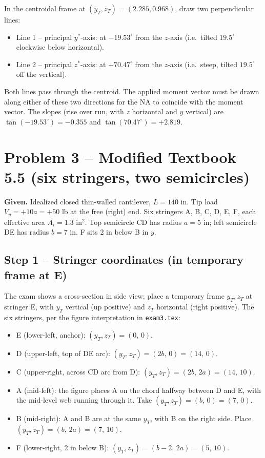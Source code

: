 \documentclass[11pt]{article}
\begin{document}
In the centroidal frame at $(\bar y_T, \bar z_T) = (2.285, 0.968)$, draw two perpendicular lines:
\begin{itemize}[leftmargin=2em, itemsep=0pt]
  \item Line 1 -- principal $y^\ast$-axis: at $-19.53^\circ$ from the $z$-axis (i.e.\ tilted $19.5^\circ$ clockwise below horizontal).
  \item Line 2 -- principal $z^\ast$-axis: at $+70.47^\circ$ from the $z$-axis (i.e.\ steep, tilted $19.5^\circ$ off the vertical).
\end{itemize}
Both lines pass through the centroid. The applied moment vector must be drawn along either of these two directions for the NA to coincide with the moment vector. The slopes (rise over run, with $z$ horizontal and $y$ vertical) are $\tan(-19.53^\circ) = -0.355$ and $\tan(70.47^\circ) = +2.819$.

\section{Problem 3 -- Modified Textbook 5.5 (six stringers, two semicircles)}

\textbf{Given.} Idealized closed thin-walled cantilever, $L = 140$ in. Tip load $V_y = +10a = +50$ lb at the free (right) end. Six stringers A, B, C, D, E, F, each effective area $A_i = 1.3$ in$^2$. Top semicircle CD has radius $a = 5$ in; left semicircle DE has radius $b = 7$ in. F sits 2 in below B in $y$.

\subsection*{Step 1 -- Stringer coordinates (in temporary frame at E)}

The exam shows a cross-section in side view; place a temporary frame $y_T, z_T$ at stringer E, with $y_T$ vertical (up positive) and $z_T$ horizontal (right positive). The six stringers, per the figure interpretation in \texttt{exam3.tex}:
\begin{itemize}[leftmargin=2em, itemsep=0pt]
  \item E (lower-left, anchor): $(y_T, z_T) = (0,\, 0)$.
  \item D (upper-left, top of DE arc): $(y_T, z_T) = (2b,\, 0) = (14,\, 0)$.
  \item C (upper-right, across CD arc from D): $(y_T, z_T) = (2b,\, 2a) = (14,\, 10)$.
  \item A (mid-left): the figure places A on the chord halfway between D and E, with the mid-level web running through it. Take $(y_T, z_T) = (b,\, 0) = (7,\, 0)$.
  \item B (mid-right): A and B are at the same $y_T$, with B on the right side. Place $(y_T, z_T) = (b,\, 2a) = (7,\, 10)$.
  \item F (lower-right, 2 in below B): $(y_T, z_T) = (b - 2,\, 2a) = (5,\, 10)$.
\end{itemize}
\end{document}
